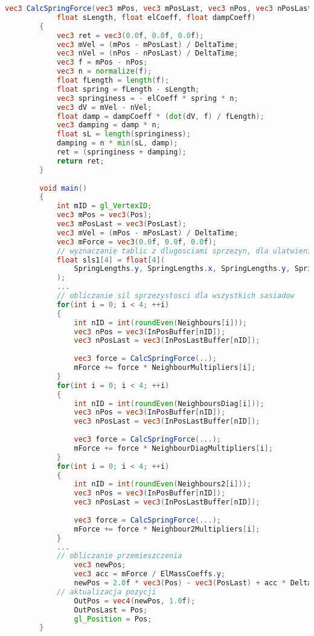 		\begin{lstlisting}[language=GLSL]
		vec3 CalcSpringForce(vec3 mPos, vec3 mPosLast, vec3 nPos, vec3 nPosLast, 
			float sLength, float elCoeff, float dampCoeff)
		{
			vec3 ret = vec3(0.0f, 0.0f, 0.0f);
			vec3 mVel = (mPos - mPosLast) / DeltaTime;
			vec3 nVel = (nPos - nPosLast) / DeltaTime;
			vec3 f = mPos - nPos;
			vec3 n = normalize(f);
			float fLength = length(f);
			float spring = fLength - sLength;
			vec3 springiness = - elCoeff * spring * n;
			vec3 dV = mVel - nVel;
			float damp = dampCoeff * (dot(dV, f) / fLength);
			vec3 damping = damp * n;
			float sL = length(springiness);
			damping = n * min(sL, damp);
			ret = (springiness + damping);
			return ret;
		}
		
		void main()
		{
			int mID = gl_VertexID;
			vec3 mPos = vec3(Pos);
			vec3 mPosLast = vec3(PosLast);
			vec3 mVel = (mPos - mPosLast) / DeltaTime;
			vec3 mForce = vec3(0.0f, 0.0f, 0.0f);
			// wyznaczanie tablic z dlugosciami sprzezyn, dla ulatwienia dostepu z petli
			float sls1[4] = float[4](
				SpringLengths.y, SpringLengths.x, SpringLengths.y, SpringLengths.x
			);
			...
			// obliczanie sil sprzezystosci dla wszystkich sasiadow
			for(int i = 0; i < 4; ++i)
			{
				int nID = int(roundEven(Neighbours[i]));
				vec3 nPos = vec3(InPosBuffer[nID]);
				vec3 nPosLast = vec3(InPosLastBuffer[nID]);
				
				vec3 force = CalcSpringForce(..);
				mForce += force * NeighbourMultipliers[i];
			}
			for(int i = 0; i < 4; ++i)
			{
				int nID = int(roundEven(NeighboursDiag[i]));
				vec3 nPos = vec3(InPosBuffer[nID]);
				vec3 nPosLast = vec3(InPosLastBuffer[nID]);
				
				vec3 force = CalcSpringForce(...);
				mForce += force * NeighbourDiagMultipliers[i];
			}
			for(int i = 0; i < 4; ++i)
			{
				int nID = int(roundEven(Neighbours2[i]));
				vec3 nPos = vec3(InPosBuffer[nID]);
				vec3 nPosLast = vec3(InPosLastBuffer[nID]);
				
				vec3 force = CalcSpringForce(...);
				mForce += force * Neighbour2Multipliers[i];
			}
			...
			// obliczanie przemieszczenia
				vec3 newPos;
				vec3 acc = mForce / ElMassCoeffs.y;
				newPos = 2.0f * vec3(Pos) - vec3(PosLast) + acc * DeltaTime * DeltaTime;
			// aktualizacja pozycji
				OutPos = vec4(newPos, 1.0f);
				OutPosLast = Pos;
				gl_Position = Pos;
		}
		\end{lstlisting}
		
